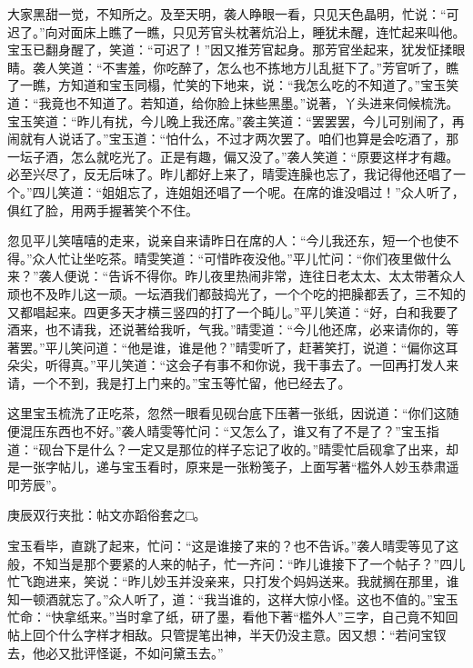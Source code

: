 \begin{parag}
    大家黑甜一觉，不知所之。及至天明，袭人睁眼一看，只见天色晶明，忙说：“可迟了。”向对面床上瞧了一瞧，只见芳官头枕著炕沿上，睡犹未醒，连忙起来叫他。宝玉已翻身醒了，笑道：“可迟了！”因又推芳官起身。那芳官坐起来，犹发怔揉眼睛。袭人笑道：“不害羞，你吃醉了，怎么也不拣地方儿乱挺下了。”芳官听了，瞧了一瞧，方知道和宝玉同榻，忙笑的下地来，说：“我怎么吃的不知道了。”宝玉笑道：“我竟也不知道了。若知道，给你脸上抹些黑墨。”说著，丫头进来伺候梳洗。宝玉笑道：“昨儿有扰，今儿晚上我还席。”袭主笑道：“罢罢罢，今儿可别闹了，再闹就有人说话了。”宝玉道：“怕什么，不过才两次罢了。咱们也算是会吃酒了，那一坛子酒，怎么就吃光了。正是有趣，偏又没了。”袭人笑道：“原要这样才有趣。必至兴尽了，反无后味了。昨儿都好上来了，晴雯连臊也忘了，我记得他还唱了一个。”四儿笑道：“姐姐忘了，连姐姐还唱了一个呢。在席的谁没唱过！”众人听了，俱红了脸，用两手握著笑个不住。
\end{parag}


\begin{parag}
    忽见平儿笑嘻嘻的走来，说亲自来请昨日在席的人：“今儿我还东，短一个也使不得。”众人忙让坐吃茶。晴雯笑道：“可惜昨夜没他。”平儿忙问：“你们夜里做什么来？”袭人便说：“告诉不得你。昨儿夜里热闹非常，连往日老太太、太太带著众人顽也不及昨儿这一顽。一坛酒我们都鼓捣光了，一个个吃的把臊都丢了，三不知的又都唱起来。四更多天才横三竖四的打了一个盹儿。”平儿笑道：“好，白和我要了酒来，也不请我，还说著给我听，气我。”晴雯道：“今儿他还席，必来请你的，等著罢。”平儿笑问道：“他是谁，谁是他？”晴雯听了，赶著笑打，说道：“偏你这耳朵尖，听得真。”平儿笑道：“这会子有事不和你说，我干事去了。一回再打发人来请，一个不到，我是打上门来的。”宝玉等忙留，他已经去了。
\end{parag}


\begin{parag}
    这里宝玉梳洗了正吃茶，忽然一眼看见砚台底下压著一张纸，因说道：“你们这随便混压东西也不好。”袭人晴雯等忙问：“又怎么了，谁又有了不是了？”宝玉指道：“砚台下是什么？一定又是那位的样子忘记了收的。”晴雯忙启砚拿了出来，却是一张字帖儿，递与宝玉看时，原来是一张粉笺子，上面写著“槛外人妙玉恭肃遥叩芳辰”。\begin{note}庚辰双行夹批：帖文亦蹈俗套之□。\end{note}宝玉看毕，直跳了起来，忙问：“这是谁接了来的？也不告诉。”袭人晴雯等见了这般，不知当是那个要紧的人来的帖子，忙一齐问：“昨儿谁接下了一个帖子？”四儿忙飞跑进来，笑说：“昨儿妙玉并没亲来，只打发个妈妈送来。我就搁在那里，谁知一顿酒就忘了。”众人听了，道：“我当谁的，这样大惊小怪。这也不值的。”宝玉忙命：“快拿纸来。”当时拿了纸，研了墨，看他下著“槛外人”三字，自己竟不知回帖上回个什么字样才相敌。只管提笔出神，半天仍没主意。因又想：“若问宝钗去，他必又批评怪诞，不如问黛玉去。”
\end{parag}


